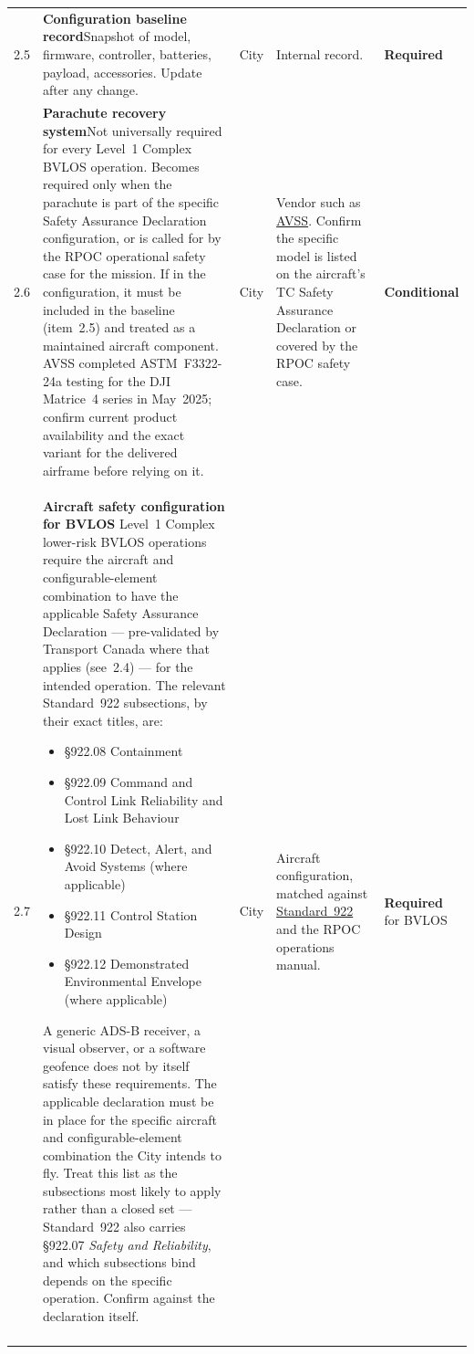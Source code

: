\documentclass[11pt,letterpaper]{article}
\newcommand{\itemrule}{\arrayrulecolor{uavrule}\midrule\arrayrulecolor{black}}
\newcommand{\reqcell}[2]{\textbf{#1}\newline\small\color{uavgrey}#2}
\newcommand{\req}{\textbf{\color{uavwarn!85!black}Required}}
\newcommand{\cond}{\textbf{\color{uavblue}Conditional}}
\begin{document}
\begin{longtable}{@{}L{0.28in} L{2.20in} L{0.85in} L{1.95in} L{0.85in}@{}}
2.5 &
\reqcell{Configuration baseline record}{Snapshot of model, firmware, controller, batteries, payload, accessories. Update after any change.} &
City &
Internal record. &
\req{} \\ \itemrule

2.6 &
\reqcell{Parachute recovery system}{Not universally required for every Level~1 Complex BVLOS operation. Becomes required only when the parachute is part of the specific Safety Assurance Declaration configuration, or is called for by the RPOC operational safety case for the mission. If in the configuration, it must be included in the baseline (item~2.5) and treated as a maintained aircraft component. AVSS completed ASTM~F3322-24a testing for the DJI Matrice~4 series in May~2025; confirm current product availability and the exact variant for the delivered airframe before relying on it.} &
City &
Vendor such as \href{https://avss.co/}{AVSS}. Confirm the specific model is listed on the aircraft's TC Safety Assurance Declaration or covered by the RPOC safety case. &
\cond{} \\ \itemrule

2.7 &
{\textbf{Aircraft safety configuration for BVLOS}\newline
\small\color{uavgrey}%
Level~1 Complex lower-risk BVLOS operations require the aircraft and
configurable-element combination to have the applicable Safety
Assurance Declaration --- pre-validated by Transport Canada where that
applies (see~2.4) --- for the intended operation. The relevant
Standard~922 subsections, by their exact titles, are:
\begin{itemize}[leftmargin=1em, itemsep=1pt, topsep=2pt, parsep=0pt]
  \item \S922.08 Containment
  \item \S922.09 Command and Control Link Reliability and Lost Link
        Behaviour
  \item \S922.10 Detect, Alert, and Avoid Systems (where applicable)
  \item \S922.11 Control Station Design
  \item \S922.12 Demonstrated Environmental Envelope (where applicable)
\end{itemize}
A generic ADS-B receiver, a visual observer, or a software geofence
does not by itself satisfy these requirements. The applicable
declaration must be in place for the specific aircraft and
configurable-element combination the City intends to fly. Treat this
list as the subsections most likely to apply rather than a closed set
--- Standard~922 also carries \S922.07 \emph{Safety and Reliability},
and which subsections bind depends on the specific operation. Confirm
against the declaration itself.} &
City &
Aircraft configuration, matched against
\href{https://tc.canada.ca/en/corporate-services/acts-regulations/list-regulations/canadian-aviation-regulations-sor-96-433/standards/standard-922-rpas-safety-assurance}{Standard~922}
and the RPOC operations manual. &
\req{} for BVLOS \\ \itemrule


\end{longtable}
\end{document}
